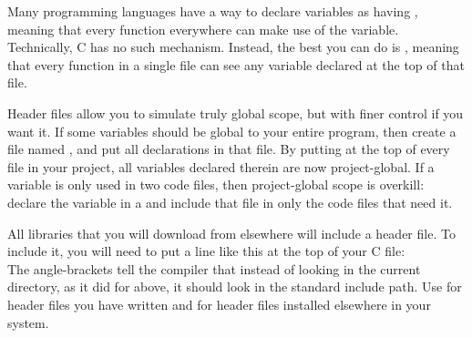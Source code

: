  \label{fileglobal}
Many programming languages have a way to declare variables as having
, meaning that every function everywhere can make use
of the variable. Technically, C has no such mechanism. Instead, the best
you can do is , meaning that every function in a
single file can see any variable declared at the top of that file.

Header files allow you to simulate truly global scope, but with finer
control if you want it. If some variables should be global to your
entire program, then create a file named , and put all
declarations in that file. By putting  at
the top of every file in your project, all variables declared therein
are now project-global.  If a variable is only used in two code files,
then project-global scope is overkill: declare the variable in a 
 and include that file in only the code files that need it.

All libraries that you will download from elsewhere will include a header file.
To include it, you will need to put a line like this at the top of your C file:
\\
The angle-brackets tell the compiler that instead of looking in the
current directory, as it did for  above, it should
look in the standard include path. Use  for header
files you have written and  for header files
installed elsewhere in your system.  


